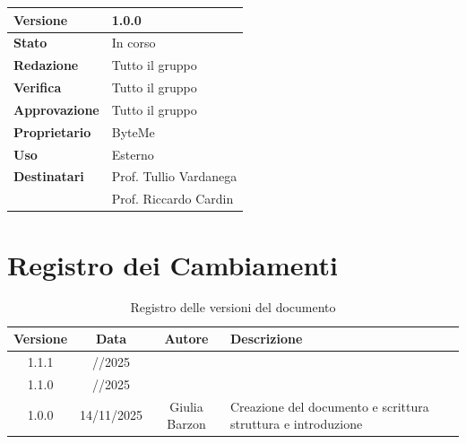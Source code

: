 \documentclass[11pt,a4paper]{article}
\begin{document}
\begin{titlepage}
    \begin{table}[H]
        \centering
        \begin{tabular}{|l|p{5cm}|}
            \hline
            \textbf{Versione} & 1.0.0 \\
            \hline
            \textbf{Stato} & In corso \\
            \hline
            \textbf{Redazione} & Tutto il gruppo \\
            \hline
            \textbf{Verifica} & Tutto il gruppo \\
            \hline
            \textbf{Approvazione} & Tutto il gruppo \\
            \hline
            \textbf{Proprietario} & ByteMe \\
            \hline
            \textbf{Uso} & Esterno \\
            \hline
            \textbf{Destinatari} & Prof. Tullio Vardanega \\ & Prof. Riccardo Cardin \\
            \hline
        \end{tabular}
    \end{table}
    
    \vfill
\end{titlepage}

\section*{Registro dei Cambiamenti}

\begin{table}[H]
    \centering
    \begin{tabular}{|c|c|c|>{\raggedright\arraybackslash}p{}|}
        \hline
        \textbf{Versione} & \textbf{Data} & \textbf{Autore} & \textbf{Descrizione} \\
        \hline
        1.1.1 & //2025 &  &  \\
        \hline
        1.1.0 & //2025 &  &  \\
        \hline
        1.0.0 & 14/11/2025 & Giulia Barzon & Creazione del documento e scrittura struttura e introduzione \\
        \hline
    \end{tabular}
    \caption{Registro delle versioni del documento}
    \label{tab:versionamento}
\end{table}

\newpage
\end{document}
